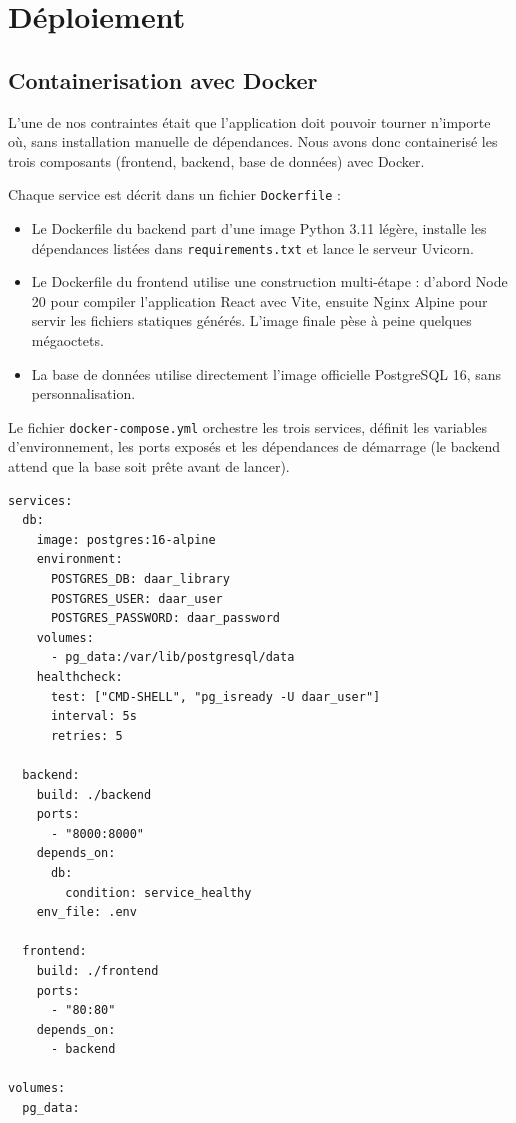 \documentclass[12pt,a4paper]{article}
\begin{document}
\section{Déploiement}

\subsection{Containerisation avec Docker}

L'une de nos contraintes était que l'application doit pouvoir tourner
n'importe où, sans installation manuelle de dépendances. Nous avons donc
containerisé les trois composants (frontend, backend, base de données)
avec Docker.

Chaque service est décrit dans un fichier \texttt{Dockerfile} :
\begin{itemize}
  \item Le Dockerfile du backend part d'une image Python 3.11 légère,
        installe les dépendances listées dans \texttt{requirements.txt} et
        lance le serveur Uvicorn.
  \item Le Dockerfile du frontend utilise une construction multi-étape :
        d'abord Node 20 pour compiler l'application React avec Vite,
        ensuite Nginx Alpine pour servir les fichiers statiques générés.
        L'image finale pèse à peine quelques mégaoctets.
  \item La base de données utilise directement l'image officielle
        PostgreSQL 16, sans personnalisation.
\end{itemize}

Le fichier \texttt{docker-compose.yml} orchestre les trois services,
définit les variables d'environnement, les ports exposés et les dépendances
de démarrage (le backend attend que la base soit prête avant de lancer).

\begin{lstlisting}[style=yaml, caption={Extrait de docker-compose.yml.}, label=lst:compose]
services:
  db:
    image: postgres:16-alpine
    environment:
      POSTGRES_DB: daar_library
      POSTGRES_USER: daar_user
      POSTGRES_PASSWORD: daar_password
    volumes:
      - pg_data:/var/lib/postgresql/data
    healthcheck:
      test: ["CMD-SHELL", "pg_isready -U daar_user"]
      interval: 5s
      retries: 5

  backend:
    build: ./backend
    ports:
      - "8000:8000"
    depends_on:
      db:
        condition: service_healthy
    env_file: .env

  frontend:
    build: ./frontend
    ports:
      - "80:80"
    depends_on:
      - backend

volumes:
  pg_data:
\end{lstlisting}
\end{document}
